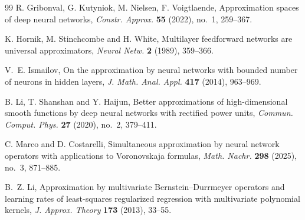 \documentclass[12pt, reqno]{amsart}
\numberwithin{equation}{section}
\theoremstyle{definition}
\theoremstyle{remark}
\numberwithin{equation}{section}
\begin{document}
\begin{thebibliography}{99}
 R. Gribonval, G. Kutyniok, M. Nielsen, F. Voigtlaende, Approximation spaces of deep neural networks, \textit{Constr. Approx.} \textbf{55} (2022), no.~1, 259--367.

 K. Hornik, M. Stinchcombe and H. White, Multilayer feedforward networks are universal approximators, \textit{Neural Netw.} \textbf{2} (1989), 359--366.

 V.~E. Ismailov, On the approximation by neural networks with bounded number of neurons in hidden layers, \textit{J. Math. Anal. Appl.} \textbf{417} (2014), 963--969.

 B. Li, T. Shanshan and Y. Haijun, Better approximations of high-dimensional smooth functions by deep neural networks with rectified power units, \textit{Commun. Comput. Phys.} \textbf{27} (2020), no.~2, 379--411.

 C. Marco and D. Costarelli, Simultaneous approximation by neural network operators with applications to Voronovskaja formulas, \textit{Math. Nachr.} \textbf{298} (2025), no.~3, 871--885.

 B.~Z. Li, Approximation by multivariate Bernstein--Durrmeyer operators and learning rates of least-squares regularized regression with multivariate polynomial kernels, \textit{J. Approx. Theory} \textbf{173} (2013), 33--55.

\end{thebibliography}
\end{document}
